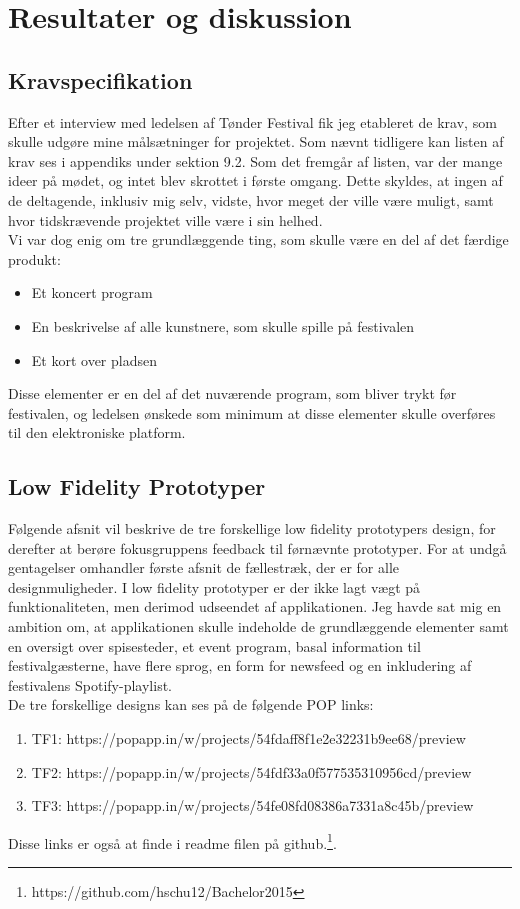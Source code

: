 \documentclass[a4paper,10pt,titlepage]{article}
\begin{document}
\section{Resultater og diskussion}
\subsection{Kravspecifikation}
Efter et interview med ledelsen af Tønder Festival fik jeg etableret de krav, som skulle udgøre mine målsætninger for projektet. Som nævnt tidligere kan listen af krav ses i appendiks under sektion 9.2. Som det fremgår af listen, var der mange ideer på mødet, og intet blev skrottet i første omgang. Dette skyldes, at ingen af de deltagende, inklusiv mig selv, vidste, hvor meget der ville være muligt, samt hvor tidskrævende projektet ville være i sin helhed.\\
Vi var dog enig om tre grundlæggende ting, som skulle være en del af det færdige produkt:
\begin{itemize}
\item
Et koncert program
\item
En beskrivelse af alle kunstnere, som skulle spille på festivalen
\item
Et kort over pladsen
\end{itemize}
Disse elementer er en del af det nuværende program, som bliver trykt før festivalen, og ledelsen ønskede som minimum at disse elementer skulle overføres til den elektroniske platform.
\subsection{Low Fidelity Prototyper}
Følgende afsnit vil beskrive de tre forskellige low fidelity prototypers design, for derefter at berøre fokusgruppens feedback til førnævnte prototyper. For at undgå gentagelser omhandler første afsnit de fællestræk, der er for alle designmuligheder. I low fidelity prototyper er der ikke lagt vægt på funktionaliteten, men derimod udseendet af applikationen. Jeg havde sat mig en ambition om, at applikationen skulle indeholde de grundlæggende elementer samt en oversigt over spisesteder, et event program, basal information til festivalgæsterne, have flere sprog, en form for newsfeed og en inkludering af festivalens Spotify-playlist.\\
De tre forskellige designs kan ses på de følgende POP links:
\begin{enumerate}
\item
TF1: https://popapp.in/w/projects/54fdaff8f1e2e32231b9ee68/preview
\item
TF2: https://popapp.in/w/projects/54fdf33a0f577535310956cd/preview
\item
TF3: https://popapp.in/w/projects/54fe08fd08386a7331a8c45b/preview
\end{enumerate}
Disse links er også at finde i readme filen på github.\footnote{https://github.com/hschu12/Bachelor2015}.
\end{document}
